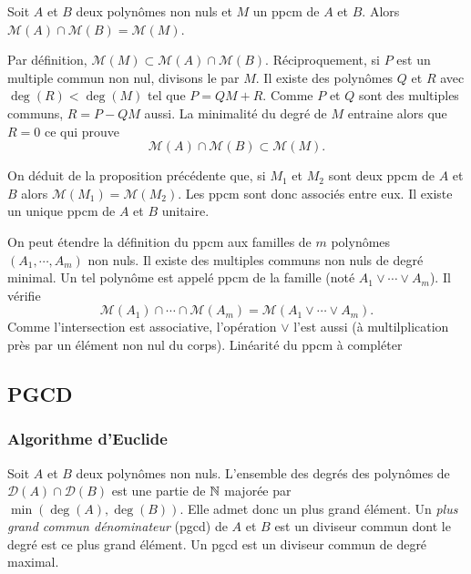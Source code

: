 \begin{prop}
Soit $A$ et $B$ deux polynômes non nuls et $M$ un ppcm de $A$ et $B$. Alors  $\mathcal{M}(A)\cap \mathcal{M}(B) = \mathcal{M}(M)$.
\end{prop}
\begin{demo}
Par définition, $\mathcal{M}(M) \subset \mathcal{M}(A) \cap \mathcal{M}(B)$. Réciproquement, si $P$ est un multiple commun non nul, divisons le par $M$. Il existe des polynômes $Q$ et $R$ avec $\deg(R) < \deg(M)$ tel que $P = QM +R$. Comme $P$ et $Q$ sont  des multiples communs, $R = P-QM$ aussi. La minimalité du degré de $M$ entraine alors que $R=0$ ce qui prouve
\[
 \mathcal{M}(A)\cap \mathcal{M}(B) \subset \mathcal{M}(M). 
\]
\end{demo}
\begin{rem}
 On déduit de la proposition précédente que, si $M_1$ et $M_2$ sont deux ppcm de $A$ et $B$ alors $\mathcal{M}(M_1)=\mathcal{M}(M_2)$. Les ppcm sont donc associés entre eux.\newline
 Il existe un unique ppcm de $A$ et $B$ unitaire.
\end{rem}
On peut étendre la définition du ppcm aux familles de $m$ polynômes $(A_1, \cdots, A_m)$ non nuls. Il existe des multiples communs non nuls de degré minimal. Un tel polynôme est appelé ppcm de la famille (noté $A_1 \vee \cdots \vee A_m$). Il vérifie
\[
 \mathcal{M}(A_1) \cap \cdots \cap \mathcal{M}(A_m) = \mathcal{M}(A_1 \vee \cdots \vee A_m).
\]
Comme l'intersection est associative, l'opération $\vee$ l'est aussi (à multilplication près par un élément non nul du corps).
Linéarité du ppcm à compléter

\subsection{PGCD}
\subsubsection{Algorithme d'Euclide}
\begin{defi}
 Soit $A$ et $B$ deux polynômes non nuls. L'ensemble des degrés des polynômes de $\mathcal{D}(A)\cap \mathcal{D}(B)$ est une partie de $\mathbb{N}$ majorée par $\min(\deg(A),\deg(B))$. Elle admet donc un plus grand élément. Un \emph{plus grand commun dénominateur} (pgcd) de $A$ et $B$ est un diviseur commun dont le degré est ce plus grand élément. Un pgcd est un diviseur commun  de degré maximal.
\end{defi}

